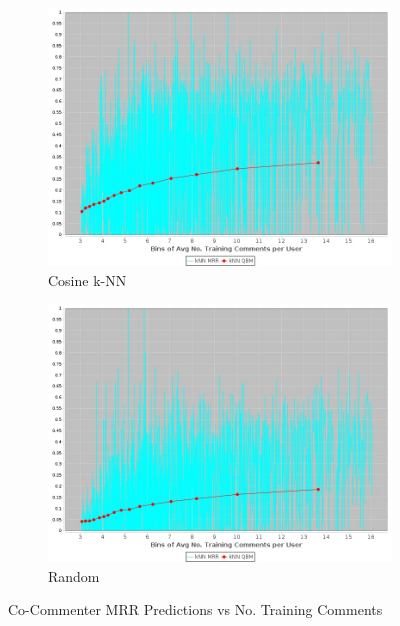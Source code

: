 \begin{figure}[!h]
\centering
\begin{subfigure}[b]{0.475\textwidth}
    \centering
    \includegraphics[width=\textwidth]{c-inv_images/co_AuthorshipUserCountMRR.jpeg}
    \caption{Cosine k-NN}
\end{subfigure}
\begin{subfigure}[b]{0.475\textwidth}
    \centering
    \includegraphics[width=\textwidth]{c-inv_images/randCo_AuthorshipUserCountMRR.jpeg}
    \caption{Random}
\end{subfigure}
\caption{Co-Commenter MRR Predictions vs No. Training Comments}
\label{fig:co_AuthorshipUserCountMRR}
\end{figure}

